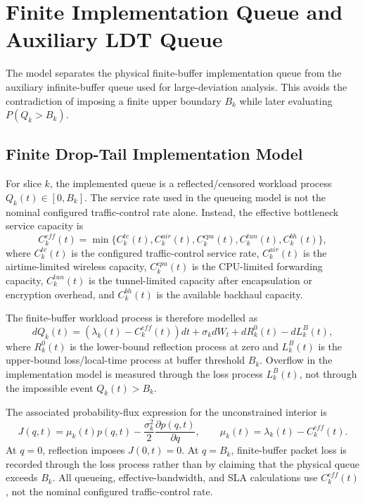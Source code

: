 \section{Finite Implementation Queue and Auxiliary LDT Queue}
\label{sec:queue-split}

The model separates the physical finite-buffer implementation queue from the auxiliary
infinite-buffer queue used for large-deviation analysis. This avoids the contradiction of
imposing a finite upper boundary $B_k$ while later evaluating $P(Q_k>B_k)$.

\subsection{Finite Drop-Tail Implementation Model}
\label{sec:finite-queue}

For slice $k$, the implemented queue is a reflected/censored workload process
$Q_k(t)\in[0,B_k]$. The service rate used in the queueing model is not the nominal
configured traffic-control rate alone. Instead, the effective bottleneck service capacity
is
\begin{equation}
  C_k^{eff}(t)=
  \min\{C_k^{tc}(t),C_k^{air}(t),C_k^{cpu}(t),C_k^{tun}(t),C_k^{bh}(t)\},
  \label{eq:effective-service}
\end{equation}
where $C_k^{tc}(t)$ is the configured traffic-control service rate,
$C_k^{air}(t)$ is the airtime-limited wireless capacity, $C_k^{cpu}(t)$ is the
CPU-limited forwarding capacity, $C_k^{tun}(t)$ is the tunnel-limited capacity after
encapsulation or encryption overhead, and $C_k^{bh}(t)$ is the available backhaul
capacity.

The finite-buffer workload process is therefore modelled as
\begin{equation}
  dQ_k(t)=
  \left(\lambda_k(t)-C_k^{eff}(t)\right)dt
  +\sigma_k dW_t+dR_k^0(t)-dL_k^B(t),
  \label{eq:finite-queue-sde}
\end{equation}
where $R_k^0(t)$ is the lower-bound reflection process at zero and $L_k^B(t)$ is the
upper-bound loss/local-time process at buffer threshold $B_k$. Overflow in the
implementation model is measured through the loss process $L_k^B(t)$, not through
the impossible event $Q_k(t)>B_k$.

The associated probability-flux expression for the unconstrained interior is
\begin{equation}
  J(q,t)=\mu_k(t)p(q,t)-\frac{\sigma_k^2}{2}\frac{\partial p(q,t)}{\partial q},
  \qquad
  \mu_k(t)=\lambda_k(t)-C_k^{eff}(t).
  \label{eq:flux}
\end{equation}
At $q=0$, reflection imposes $J(0,t)=0$. At $q=B_k$, finite-buffer packet loss is
recorded through the loss process rather than by claiming that the physical queue
exceeds $B_k$. All queueing, effective-bandwidth, and SLA calculations use
$C_k^{eff}(t)$, not the nominal configured traffic-control rate.

